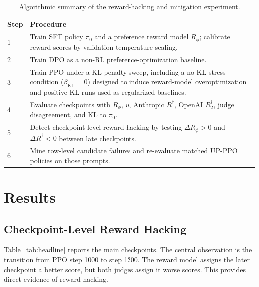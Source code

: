 \documentclass[twocolumn,10pt]{article}
\newcommand{\Rphi}{R_{\phi}}
\newcommand{\Rdag}{R^{\dagger}}
\newcommand{\Rtwo}{R^{\dagger}_2}
\begin{document}
\begin{table}[!tbp]
\centering
\scriptsize
\caption{External judge configuration. Both judges receive the generated assistant reply and return a single helpfulness score in $[1,10]$.}
\label{tab:judge_config}
\end{table}

\begin{table}[!tbp]
\centering
\tiny
\caption{Algorithmic summary of the reward-hacking and mitigation experiment.}
\label{alg:main}
\begin{tabular}{@{}p{}p{}@{}}
\toprule
Step & Procedure \\
\midrule
1 & Train SFT policy $\pi_0$ and a preference reward model $\Rphi$; calibrate reward scores by validation temperature scaling. \\
2 & Train DPO as a non-RL preference-optimization baseline. \\
3 & Train PPO under a KL-penalty sweep, including a no-KL stress condition ($\beta_{\mathrm{KL}}=0$) designed to induce reward-model overoptimization and positive-KL runs used as regularized baselines. \\
4 & Evaluate checkpoints with $\Rphi$, $u$, Anthropic $\Rdag$, OpenAI $\Rtwo$, judge disagreement, and KL to $\pi_0$. \\
5 & Detect checkpoint-level reward hacking by testing $\Delta\Rphi>0$ and $\Delta\bar R^\dagger<0$ between late checkpoints. \\
6 & Mine row-level candidate failures and re-evaluate matched UP-PPO policies on those prompts. \\
\bottomrule
\end{tabular}
\end{table}

\section{Results}
\subsection{Checkpoint-Level Reward Hacking}
Table~\ref{tab:headline} reports the main checkpoints. The central observation is the transition from PPO step 1000 to step 1200. The reward model assigns the later checkpoint a better score, but both judges assign it worse scores. This provides direct evidence of reward hacking.
\end{document}
